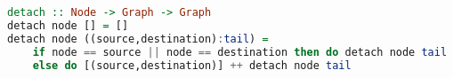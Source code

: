 \begin{lstlisting}[language=haskell]
detach :: Node -> Graph -> Graph
detach node [] = []
detach node ((source,destination):tail) =
    if node == source || node == destination then do detach node tail
    else do [(source,destination)] ++ detach node tail
\end{lstlisting}